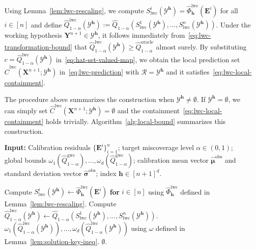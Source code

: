 Using Lemma~\ref{lem:lwc-rescaling}, we compute $S^i_{\mathrm{lwc}}(\mathcal{Y}^{\mathbf{h}})= \hat{\Phi}^{\mathrm{lwc}}_{\mathbf{h}}(\mathbf{E}^i)$ for all $i\in [n]$ and define $\hat{Q}^{\mathrm{lwc}}_{1-\alpha}(\mathcal{Y}^{\mathbf{h}}):= \hat{Q}_{1-\alpha}(S^1_{\mathrm{lwc}}(\mathcal{Y}^{\mathbf{h}}), \ldots, S^n_{\mathrm{lwc}}(\mathcal{Y}^{\mathbf{h}}))$. Under the working hypothesis $\mathbf{Y}^{n+1} \in \mathcal{Y}^{\mathbf{h}}$, it follows immediately from~\eqref{eq:lwc-transformation-bound} that 
$\hat{Q}^{\mathrm{lwc}}_{1-\alpha}(\mathcal{Y}^{\mathbf{h}})\ge \hat{Q}^{\mathrm{oracle}}_{1-\alpha}$ almost surely.
By substituting $c = \hat{Q}^{\mathrm{lwc}}_{1-\alpha}(\mathcal{Y}^{\mathbf{h}})$ in~\eqref{eq:hat-set-valued-map}, we obtain the local prediction set $\hat{C}^{\mathrm{lwc}}(\mathbf{X}^{n+1};\mathcal{Y}^{\mathbf{h}})$ in~\eqref{eq:lwc-prediction} with $\mathcal{R} = \mathcal{Y}^{\mathbf{h}}$ and it satisfies~\eqref{eq:lwc-local-containment}.

The procedure above summarizes the construction when $\mathcal{Y}^{\mathbf{h}} \neq \emptyset$.
If $\mathcal{Y}^{\mathbf{h}} = \emptyset$, we can simply set $\hat{C}^{\mathrm{lwc}}(\mathbf{X}^{n+1};\mathcal{Y}^{\mathbf{h}}) = \emptyset$ and the containment~\eqref{eq:lwc-local-containment} holds trivially. 
Algorithm~\ref{alg:local-bound} summarizes this construction. 

\begin{algorithm}[!htbp] 
\caption{Construction of local prediction sets under working hypothesis $\mathbf{Y}^{n+1} \in \mathcal{Y}^{\mathbf{h}}$} \label{alg:local-bound} 
\textbf{Input:} Calibration residuals $\{\mathbf{E}^i\}_{i=1}^{n}$; target miscoverage level $\alpha\in(0,1)$; global bounds $\omega_1(\hat{Q}^{\mathrm{gwc}}_{1-\alpha}),\ldots,\omega_d(\hat{Q}^{\mathrm{gwc}}_{1-\alpha})$; calibration mean vector $\hat{\boldsymbol\mu}^{\mathrm{obs}}$ and standard deviation vector $\hat{\boldsymbol\sigma}^{\mathrm{obs}}$; index $\mathbf{h}\in [n+1]^d$.
\begin{algorithmic}[1] 
    \State Compute $S_{\mathrm{lwc}}^i(\mathcal{Y}^{\mathbf{h}}) \gets \hat{\Phi}^{\mathrm{lwc}}_{\mathbf{h}}(\mathbf{E}^i)$ \textbf{for} $i \in [n]$ using $\hat{\Phi}^{\mathrm{lwc}}_{\mathbf{h}}$ defined in Lemma~\ref{lem:lwc-rescaling}.
    \State Compute $\hat{Q}^{\mathrm{lwc}}_{1-\alpha}(\mathcal{Y}^{\mathbf{h}}) \gets \hat{Q}_{1-\alpha}(S_{\mathrm{lwc}}^1(\mathcal{Y}^{\mathbf{h}}),\ldots,S_{\mathrm{lwc}}^n(\mathcal{Y}^{\mathbf{h}}))$. 
    \State \Return $\omega_1(\hat{Q}^{\mathrm{lwc}}_{1-\alpha}(\mathcal{Y}^{\mathbf{h}})),\ldots,\omega_d(\hat{Q}^{\mathrm{lwc}}_{1-\alpha}(\mathcal{Y}^{\mathbf{h}}))$ using $\omega$ defined in Lemma~\ref{lem:solution-key-ineq}.
\Else
\State \Return $\emptyset$.
\EndIf 
\end{algorithmic} 
\end{algorithm}

